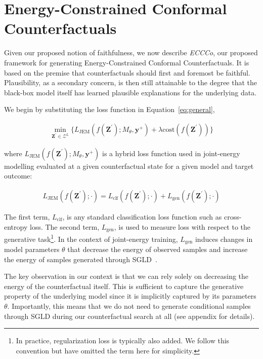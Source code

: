 \documentclass[letterpaper]{article} %
\begin{document}
\section{Energy-Constrained Conformal Counterfactuals}\label{meth}

Given our proposed notion of faithfulness, we now describe \textit{ECCCo}, our proposed framework for generating Energy-Constrained Conformal Counterfactuals. It is based on the premise that counterfactuals should first and foremost be faithful. Plausibility, as a secondary concern, is then still attainable to the degree that the black-box model itself has learned plausible explanations for the underlying data. 

We begin by substituting the loss function in Equation~\ref{eq:general},

\begin{equation} \label{eq:eccco-start}
  \begin{aligned}
  \min_{\mathbf{Z}^\prime \in \mathcal{Z}^L} \{  {L_{\text{JEM}}(f(\mathbf{Z}^\prime);M_{\theta},\mathbf{y}^+)}+ \lambda {\text{cost}(f(\mathbf{Z}^\prime)) } \} 
  \end{aligned} 
\end{equation}

where $L_{\text{JEM}}(f(\mathbf{Z}^\prime);M_{\theta},\mathbf{y}^+)$ is a hybrid loss function used in joint-energy modelling evaluated at a given counterfactual state for a given model and target outcome:

\begin{equation}
  \begin{aligned}
    L_{\text{JEM}}(f(\mathbf{Z}^\prime); \cdot) = L_{\text{clf}}(f(\mathbf{Z}^\prime); \cdot) + L_{\text{gen}}(f(\mathbf{Z}^\prime); \cdot)
  \end{aligned}
\end{equation}

The first term, $L_{\text{clf}}$, is any standard classification loss function such as cross-entropy loss. The second term, $L_{\text{gen}}$, is used to measure loss with respect to the generative task\footnote{In practice, regularization loss is typically also added. We follow this convention but have omitted the term here for simplicity.}. In the context of joint-energy training, $L_{\text{gen}}$ induces changes in model parameters $\theta$ that decrease the energy of observed samples and increase the energy of samples generated through SGLD~\citep{du2019implicit}. 

The key observation in our context is that we can rely solely on decreasing the energy of the counterfactual itself. This is sufficient to capture the generative property of the underlying model since it is implicitly captured by its parameters $\theta$. Importantly, this means that we do not need to generate conditional samples through SGLD during our counterfactual search at all (see appendix for details).
\end{document}
